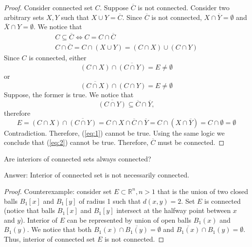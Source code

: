 \documentclass{article}
\newcommand{\R}{\mathbb{R}}
\begin{document}
\begin{proof}

Consider connected set $C$.
Suppose $\overline{C}$ is not connected.
Consider two arbitrary sets $X, Y$ such that $X \cup Y = \overline{C}$.
Since $\overline{C}$ is not connected, $X \cap \overline{Y} = \emptyset$ and $\overline{X} \cap Y = \emptyset$.
We notice that
\begin{gather*}
    C \subseteq \overline{C} \iff C = C \cap \overline{C} \\
    C \cap \overline{C} = C \cap (X \cup Y) = (C \cap X) \cup (C \cap Y)
\end{gather*}
Since $C$ is connected, either
\begin{equation}\label{eq:1}
    (C \cap X) \cap \overline{(C \cap Y)} = E \neq \emptyset 
\end{equation}
or
\begin{equation}\label{eq:2}
    \overline{(C \cap X)} \cap (C \cap Y) = E \neq \emptyset
\end{equation}
Suppose, the former is true. We notice that 
\[ \overline{(C \cap Y)} \subseteq \overline{C} \cap \overline{Y}, \]
therefore
\[ E = (C \cap X) \cap \overline{(C \cap Y)} = C \cap X \cap \overline{C} \cap \overline{Y} = C \cap (X \cap \overline{Y}) = C \cap \emptyset = \emptyset \]
Contradiction.
Therefore, (\ref{eq:1}) cannot be true.
Using the same logic we conclude that (\ref{eq:2}) cannot be true.
Therefore, $\overline{C}$ must be connected.

\end{proof}

\begin{tcolorbox}
Are interiors of connected sets always connected?
\end{tcolorbox}

Answer: Interior of connected set is not necessarily connected.

\begin{proof}

Counterexample:
consider set $E \subset \R^n, n > 1$ that is the union of two closed balls $B_1[x]$ and $B_1[y]$ of radius 1 such that $d(x, y) = 2$.
Set $E$ is connected (notice that balls $B_1[x]$ and $B_1[y]$ intersect at the halfway point between $x$ and $y$).
Interior of $E$ can be represented by union of open balls $B_1(x)$ and $B_1(y)$.
We notice that both $B_1(x) \cap \overline{B_1(y)} = \emptyset$ and $\overline{B_1(x)} \cap B_1(y) = \emptyset$.
Thus, interior of connected set $E$ is not connected.

\end{proof}
\end{document}
